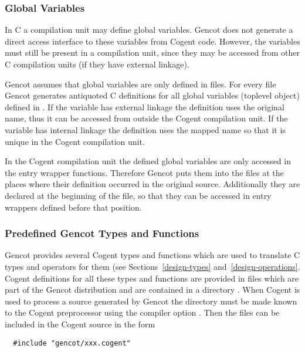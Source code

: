 \subsubsection{Global Variables}

In C a compilation unit may define global variables. Gencot does not generate a direct access interface to these variables
from Cogent code. However, the variables must still be present in a compilation unit, since they may be accessed
from other C compilation units (if they have external linkage). 

Gencot assumes that global variables are only defined in  files. For every file  Gencot generates
antiquoted C definitions for all global variables (toplevel object) defined in . If the variable has 
external linkage the definition uses the original name, thus it can be accessed from outside the Cogent compilation unit. 
If the variable has internal linkage the definition uses the mapped name so that it is unique in the Cogent compilation
unit. 

In the Cogent compilation unit the defined global variables are only accessed in 
the entry wrapper functions. Therefore Gencot puts them into the files  at the places where 
their definition occurred in the original source. Additionally they are declared at the beginning of the file, 
so that they can be accessed in entry wrappers defined before that position.

\subsubsection{Predefined Gencot Types and Functions}

Gencot provides several Cogent types and functions which are used to translate C types and operators for them
(see Sections~\ref{design-types} and~\ref{design-operations}. Cogent definitions for all these types and functions 
are provided in files which are part of the Gencot distribution and are contained in a directory .
When Cogent is used to process a source generated by Gencot the directory  must be made known to the 
Cogent preprocessor using the compiler option . Then the files can be included in the Cogent
source in the form
\begin{verbatim}
  #include "gencot/xxx.cogent"
\end{verbatim}

